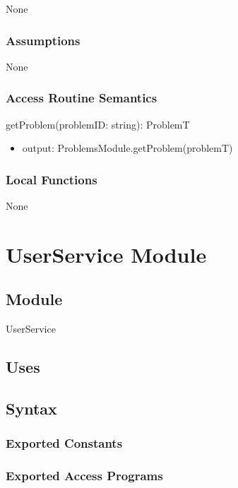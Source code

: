 \documentclass[12pt, titlepage]{article}
\begin{document}
None

\subsubsection{Assumptions}

None

\subsubsection{Access Routine Semantics}

\noindent getProblem(problemID: string): ProblemT
\begin{itemize}
\item output: ProblemsModule.getProblem(problemT)
\end{itemize}

\subsubsection{Local Functions}

None

\newpage

\section{UserService Module} \label{UserService}


\subsection{Module}
UserService

\subsection{Uses}

\subsection{Syntax}

\subsubsection{Exported Constants}

\subsubsection{Exported Access Programs}
\end{document}
